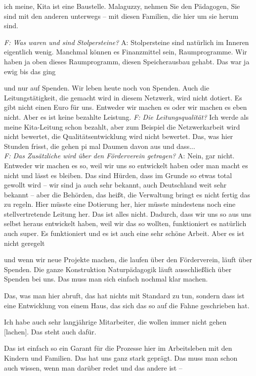 \begin{linenumbers*}
ich meine, Kita ist eine Baustelle. Malaguzzy, nehmen Sie den Pädagogen, Sie sind mit den anderen unterwegs -- mit diesen Familien, die hier um sie herum sind. 

\emph{F: Was waren und sind Stolpersteine?}
A: Stolpersteine sind natürlich im Inneren eigentlich wenig. Manchmal können es Finanzmittel sein, Raumprogramme. Wir haben ja oben dieses Raumprogramm, diesen Speicherausbau gehabt. Das war ja ewig bis das ging 

und nur auf Spenden. Wir leben heute noch von Spenden. Auch die Leitungstätigkeit, die gemacht wird in diesem Netzwerk, wird nicht dotiert. Es gibt nicht einen Euro für uns. Entweder wir machen es oder wir machen es eben nicht. Aber es ist keine bezahlte Leistung.          
\emph{F: Die Leitungsqualität?}
Ich werde als meine Kita-Leitung schon bezahlt, aber zum Beispiel die Netzwerkarbeit wird nicht bewertet, die Qualitätsentwicklung wird nicht bewertet. Das, was hier Stunden frisst, die gehen pi mal Daumen davon aus und dass...\\
\emph{F: Das Zusätzliche wird über den Förderverein getragen?}
A: Nein, gar nicht. 
Entweder wir machen es so, weil wir uns so entwickelt haben oder man macht es nicht und lässt es bleiben. Das sind Hürden, dass im Grunde so etwas total gewollt wird -- wir sind ja auch sehr bekannt, auch Deutschland weit sehr bekannt -- aber die Behörden, das heißt, die Verwaltung bringt es nicht fertig das zu regeln. Hier müsste eine Dotierung her, hier müsste mindestens noch eine stellvertretende Leitung her. Das ist alles nicht. Dadurch, dass wir uns so aus uns selbst heraus entwickelt haben, weil wir das so wollten, funktioniert es natürlich auch super. Es funktioniert und es ist auch eine sehr schöne Arbeit. Aber es ist nicht geregelt 

und wenn wir neue Projekte machen, die laufen über den Förderverein, läuft über Spenden. Die ganze Konstruktion Naturpädagogik läuft ausschließlich über Spenden bei uns.
Das muss man sich einfach nochmal klar machen. 

Das, was man hier abruft, das hat nichts mit Standard zu tun, sondern dass ist eine Entwicklung von einem Haus, das sich das so auf die Fahne geschrieben hat.
 
Ich habe auch sehr langjährige Mitarbeiter, die wollen immer nicht gehen [lachen]. Das steht auch dafür. 

Das ist einfach so ein Garant für die Prozesse hier im Arbeitsleben mit den Kindern und Familien. Das hat uns ganz stark geprägt. Das muss man schon auch wissen, wenn man darüber redet und das andere ist -- 


\end{linenumbers*}
